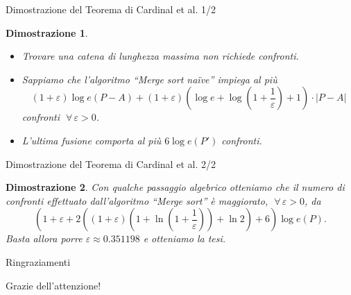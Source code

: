 \documentclass[10pt]{beamer}
\newtheorem{dimostrazione}{Dimostrazione}
\begin{document}
\begin{frame}
  {Dimostrazione del Teorema di Cardinal et al. 1/2}
  \begin{dimostrazione}
    \begin{itemize}
    \item Trovare una catena di lunghezza massima non richiede
      confronti.
    \item Sappiamo che l'algoritmo ``Merge sort na\"ive'' impiega al
      più
      \[(1+\varepsilon)\log{e(P-A)}+(1+\varepsilon)\left(\log{e}+\log{\left(1+\frac{1}{\varepsilon}\right)}+1\right)\cdot
      |P-A|\] confronti \(\;\forall\,\varepsilon > 0\).
    \item L'ultima fusione comporta al più \(6\log{e(P')}\) confronti.
    \end{itemize}
  \end{dimostrazione}
\end{frame}

\begin{frame}
  {Dimostrazione del Teorema di Cardinal et al. 2/2}
  \begin{dimostrazione}
    Con qualche passaggio algebrico otteniamo che il numero di
    confronti effettuato dall'algoritmo ``Merge sort'' è maggiorato,
    \(\;\forall\,\varepsilon > 0\), da
    \[\left(1+\varepsilon+2\left((1+\varepsilon)\left(1+\ln{\left(1+\frac{1}{\varepsilon}\right)}\right)+\ln{2}\right)+6\right)\log{e(P)}.\]
    Basta allora porre \(\varepsilon\approx 0.351198\) e otteniamo la
    tesi.
  \end{dimostrazione}
\end{frame}

\begin{frame}
  {Ringraziamenti}
  \begin{center}
    Grazie dell'attenzione!
  \end{center}
\end{frame}
\end{document}
